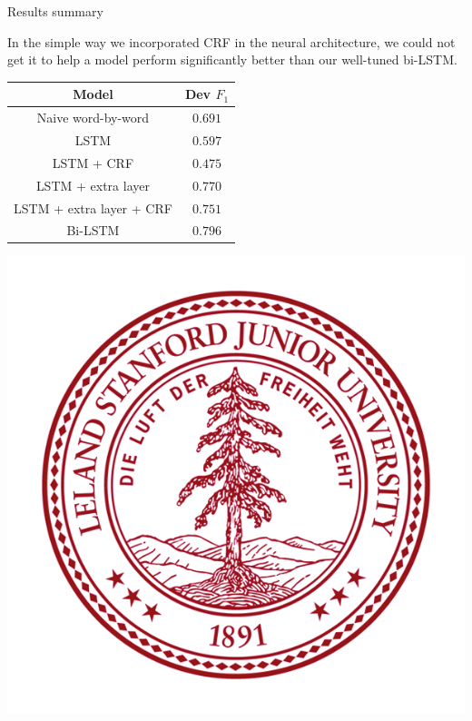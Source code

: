 \documentclass[final]{beamer}
\newlength{\onecolwid}
\begin{document}
\begin{frame}[t]
\begin{columns}[t]
\begin{column}{\onecolwid}


\begin{block}{Results summary}

In the simple way we incorporated CRF in the neural architecture, we could not get it to help a model perform significantly better than our well-tuned bi-LSTM.

\vspace{10px}

\begin{center}
   \begin{tabular}{||c | c||}
   \hline
   \textbf{Model}  & \textbf{Dev $F_1$} \\
   \hline\hline
   Naive word-by-word & $0.691$ \\
   \hline
   LSTM & $0.597$ \\
   \hline
   LSTM + CRF & $0.475$ \\
   \hline
   LSTM + extra layer & $0.770$ \\
   \hline
   LSTM + extra layer + CRF & $0.751$ \\
   \hline
   Bi-LSTM & $0.796$ \\ [1ex]
   \hline
  \end{tabular}
\end{center}


\begin{center}
    \includegraphics[scale=0.5]{Stanford_logo}
\end{center}
\end{block}


\end{column}
\end{columns}
\end{frame}
\end{document}
